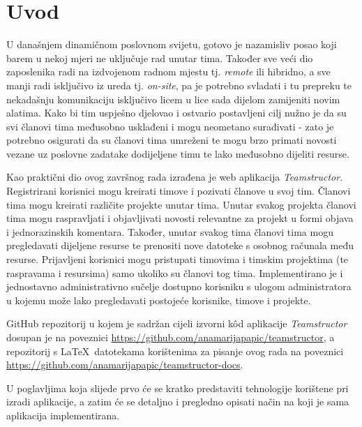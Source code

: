 \section{Uvod}
U današnjem dinamičnom poslovnom svijetu, gotovo je nazamisliv posao koji barem u nekoj mjeri ne uključuje rad unutar tima. Također sve veći dio zaposlenika radi na izdvojenom radnom mjestu tj. \textit{remote} ili hibridno, a sve manji radi isključivo iz ureda tj. \textit{on-site}, pa je potrebno svladati i tu prepreku te nekadašnju komunikaciju isključivo licem u lice sada dijelom zamijeniti novim alatima. Kako bi tim uspješno djelovao i ostvario postavljeni cilj nužno je da su svi članovi tima međusobno usklađeni i mogu neometano surađivati - zato je potrebno osigurati da su članovi tima umreženi te mogu brzo primati novosti vezane uz poslovne zadatake dodijeljene timu te lako međusobno dijeliti resurse.

Kao praktični dio ovog završnog rada izrađena je web aplikacija \textit{Teamstructor}. Registrirani korisnici mogu kreirati timove i pozivati članove u svoj tim. Članovi tima mogu kreirati različite projekte unutar tima. Unutar svakog projekta članovi tima mogu raspravljati i objavljivati novosti relevantne za projekt u formi objava i jednorazinskih komentara. Također, unutar svakog tima članovi tima mogu pregledavati dijeljene resurse te prenositi nove datoteke s osobnog računala među resurse. Prijavljeni korisnici mogu pristupati timovima i timskim projektima (te raspravama i resursima) samo ukoliko su članovi tog tima. Implementirano je i jednostavno administrativno sučelje dostupno korisniku s ulogom administratora u kojemu može lako pregledavati postojeće korisnike, timove i projekte.

GitHub repozitorij u kojem je sadržan cijeli izvorni k\^od aplikacije \textit{Teamstructor} dosupan je na poveznici \url{https://github.com/anamarijapapic/teamstructor}, a repozitorij s \LaTeX \ datotekama korištenima za pisanje ovog rada na poveznici \url{https://github.com/anamarijapapic/teamstructor-docs}.

U poglavljima koja slijede prvo će se kratko predstaviti tehnologije korištene pri izradi aplikacije, a zatim će se detaljno i pregledno opisati način na koji je sama aplikacija implementirana.

